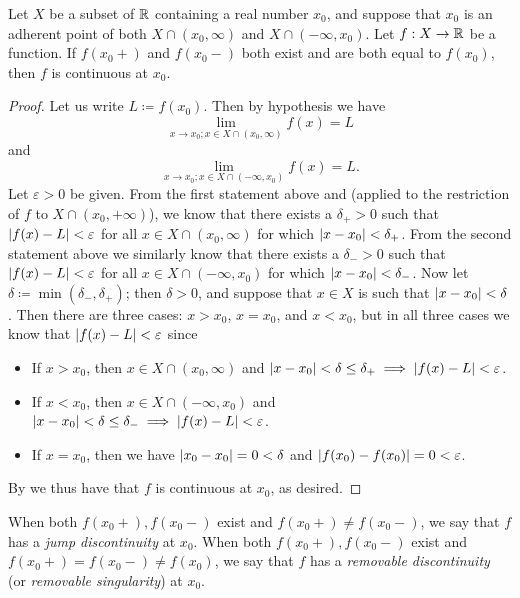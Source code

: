 \setcounter{thm}{2}
\begin{prop}\label{i:9.5.3}
  Let \(X\) be a subset of \(\mathbb{R}\) containing a real number \(x_0\), and suppose that \(x_0\) is an adherent point of both \(X \cap (x_0, \infty)\) and \(X \cap (-\infty, x_0)\).
  Let \(f : X \to \mathbb{R}\) be a function.
  If \(f(x_0+)\) and \(f(x_0-)\) both exist and are both equal to \(f(x_0)\), then \(f\) is continuous at \(x_0\).
\end{prop}

\begin{proof}
  Let us write \(L \coloneqq f(x_0)\).
  Then by hypothesis we have
  \[
    \lim_{x \to x_0 ; x \in X \cap (x_0, \infty)} f(x) = L
  \]
  and
  \[
    \lim_{x \to x_0 ; x \in X \cap (-\infty, x_0)} f(x) = L.
  \]
  Let \(\varepsilon > 0\) be given.
  From the first statement above and  (applied to the restriction of \(f\) to \(X \cap (x_0, +\infty)\)), we know that there exists a \(\delta_+ > 0\) such that \(\left\lvert f(x) - L\right\rvert < \varepsilon\) for all \(x \in X \cap(x_0, \infty)\) for which \(\left\lvert x - x_0\right\rvert < \delta_+\).
  From the second statement above we similarly know that there exists a \(\delta_- > 0\) such that \(\left\lvert f(x) - L\right\rvert < \varepsilon\) for all \(x \in X \cap (-\infty, x_0)\) for which \(\left\lvert x - x_0\right\rvert < \delta_-\).
  Now let \(\delta \coloneqq \min(\delta_-, \delta_+)\);
  then \(\delta > 0\), and suppose that \(x \in X\) is such that \(\left\lvert x - x_0\right\rvert < \delta\).
  Then there are three cases:
  \(x > x_0\), \(x = x_0\), and \(x < x_0\), but in all three cases we know that \(\left\lvert f(x) - L\right\rvert < \varepsilon\) since
  \begin{itemize}
    \item If \(x > x_0\), then \(x \in X \cap (x_0, \infty)\) and \(\left\lvert x - x_0\right\rvert < \delta \leq \delta_+ \implies \left\lvert f(x) - L\right\rvert < \varepsilon\).
    \item If \(x < x_0\), then \(x \in X \cap (-\infty, x_0)\) and \(\left\lvert x - x_0\right\rvert < \delta \leq \delta_- \implies \left\lvert f(x) - L\right\rvert < \varepsilon\).
    \item If \(x = x_0\), then we have \(\left\lvert x_0 - x_0\right\rvert = 0 < \delta\) and \(\left\lvert f(x_0) - f(x_0)\right\rvert = 0 < \varepsilon\).
  \end{itemize}
  By  we thus have that \(f\) is continuous at \(x_0\), as desired.
\end{proof}

\begin{note}
  When both \(f(x_0+), f(x_0-)\) exist and \(f(x_0+) \neq f(x_0-)\), we say that \(f\) has a \emph{jump discontinuity} at \(x_0\).
  When both \(f(x_0+), f(x_0-)\) exist and \(f(x_0+) = f(x_0-) \neq f(x_0)\), we say that \(f\) has a \emph{removable discontinuity} (or \emph{removable singularity}) at \(x_0\).
\end{note}


